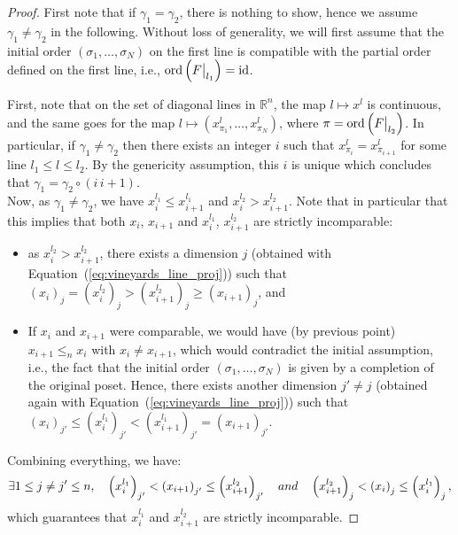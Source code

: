 \documentclass{article}
\newcommand{\R}{\mathbb{R}}
\newcommand{\leqn}{\leq_n}
\newcommand\restr[2]{{  \left.\kern-\nulldelimiterspace #1 \vphantom{\big|} \right|_{#2}  }}
\newcommand{\ordonly}[0]{\ensuremath{\mathrm{ord}}}
\newcommand{\ord}[1]{\ensuremath{\ordonly\left(#1\right)}}
\begin{document}
	\begin{proof}
		First note that if $\gamma_1 = \gamma_2$, there is nothing to show, hence we
		assume $ \gamma_1 \neq \gamma_2$ in the following.
		Without loss of generality, we will first assume that the initial order
		$(\sigma_1,\dots,\sigma_N)$ on the first line is compatible with the partial
		order defined on the first line, i.e., $\ord{\restr{F}{l_1}} = \mathrm{id}$.

		First, note that on the set of diagonal lines in $\R^n$, the map $l\mapsto x^l$ is
		continuous, and the same goes for the map $l\mapsto (x_{\pi_1}^l,
		\dots, x _{\pi_N}^l)$, where $\pi = \ord{\restr F {l_2}}$.
		In particular, if $\gamma_1\neq \gamma_2$ then there exists an integer $i$ such that
		$x _{\pi_i}^l = x _{\pi _{i+1 }}^l$ for some line $l_1\le l\le l_2$.
		By the genericity assumption, this $i$ is unique which concludes that
		$\gamma_1 = \gamma_2 \circ (i \, i+1)$. \\

		Now, as  $\gamma_1 \neq \gamma_2$, we have $x_i^{l_1}\le x_{i+1}^{l_1}$ and $x_i^{l_2}> x_{i+1}^{l_2}$.
		Note that in particular that this implies that  both
		$x_i$, $x_{i+1}$ and %
		$x_i^{l_1}$, $x_{i+1}^{l_2}$ are strictly incomparable:
		\begin{itemize}
			\item as $x_i^{l_2}> x_{i+1}^{l_2}$, there exists a dimension $j$ (obtained with Equation~(\ref{eq:vineyards_line_proj})) such that ${
				\left( x_i \right)_j = \left( x_i^{l_2} \right)_j> \left( x_{i+1}^{l_2} \right)_j \ge \left( x_{i+1} \right)_j}$, and
			\item If $x_i$ and $x_{i+1}$ were comparable, we would have (by previous point)
				$x_{i+1} \leqn x_i$ with $x_i \neq x_{i+1}$, which would contradict
				the initial assumption, i.e., the fact that the initial order $ \left( \sigma_1,\dots,\sigma_N \right)$ is given by a completion
				of the original poset.
				Hence, there exists another dimension $j'\neq j$ (obtained again with Equation~(\ref{eq:vineyards_line_proj})) such that
				$ \left( x_i \right)_{j'} \le \left( x_i^{l_1} \right)_{j'}< \left( x_{i+1}^{l_1} \right)_{j'} = \left( x_{i+1} \right)_{j'}$.
		\end{itemize}
		Combining everything,
		we have:
		\begin{equation}\label{eq:vineyards_uncomp_idx_i}
			\exists 1 \le j \neq j' \le n, \quad  \left( x_i^{l_1} \right)_{j'}< \left( x_{i+1} \right)_{j'} \leq \left( x_{i+1}^{l_2} \right)_{j'}
			\quad \textnormal{ and } \quad
			\left( x_{i+1}^{l_2} \right)_j < \left(x_i\right)_j \leq \left( x_i^{l_1} \right)_j,
		\end{equation}
		which guarantees that %
		$x_i^{l_1}$ and $x_{i+1}^{l_2}$
		are strictly incomparable.


\end{proof}
\end{document}
